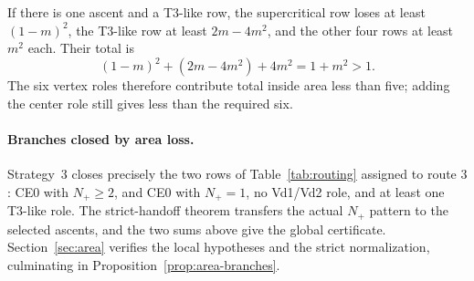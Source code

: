 If there is one ascent and a T3-like row, the supercritical row loses at
least $(1-m)^2$, the T3-like row at least $2m-4m^2$, and the other four rows
at least $m^2$ each.  Their total is
\[
 (1-m)^2+(2m-4m^2)+4m^2=1+m^2>1.
\]
The six vertex roles therefore contribute total inside area less than five;
adding the center role still gives less than the required six.

\paragraph{Branches closed by area loss.}
Strategy~3 closes precisely the two rows of Table~\ref{tab:routing} assigned
to route $3$: CE0 with $N_+\ge2$, and CE0 with $N_+=1$, no Vd1/Vd2 role, and
at least one T3-like role.  The strict-handoff theorem transfers the actual
$N_+$ pattern to the selected ascents, and the two sums above give the global
certificate.  Section~\ref{sec:area} verifies the local hypotheses and the
strict normalization, culminating in
Proposition~\ref{prop:area-branches}.
